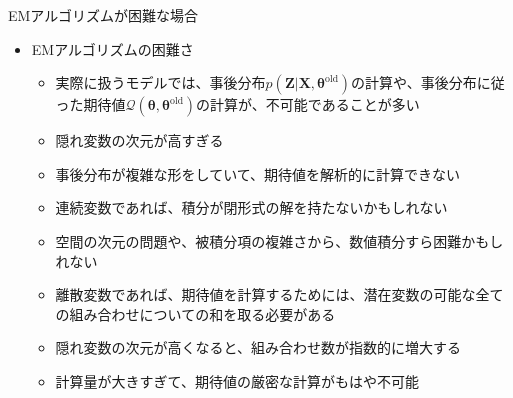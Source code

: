 \documentclass[dvipdfmx,notheorems,t]{beamer}
\begin{document}
\begin{frame}{EMアルゴリズムが困難な場合}

\begin{itemize}
	\item EMアルゴリズムの困難さ
	\begin{itemize}
		\item 実際に扱うモデルでは、事後分布$p(\bm{Z} | \bm{X}, \bm{\theta}^\mathrm{old})$の計算や、事後分布に従った期待値$\mathcal{Q}(\bm{\theta}, \bm{\theta}^\mathrm{old})$の計算が、\alert{不可能であることが多い}
		\newline
		\item 隠れ変数の\alert{次元が高すぎる}
		\item 事後分布が\alert{複雑な形をしていて}、期待値を解析的に計算できない
		\newline
		\item \alert{連続変数}であれば、積分が閉形式の解を持たないかもしれない
		\item 空間の次元の問題や、被積分項の複雑さから、数値積分すら困難かもしれない
		\newline
		\item \alert{離散変数}であれば、期待値を計算するためには、\alert{潜在変数の可能な全ての組み合わせについての和を取る}必要がある
		\item 隠れ変数の次元が高くなると、組み合わせ数が指数的に増大する
		\item 計算量が大きすぎて、期待値の厳密な計算がもはや不可能
	\end{itemize}
\end{itemize}

\end{frame}
\end{document}
